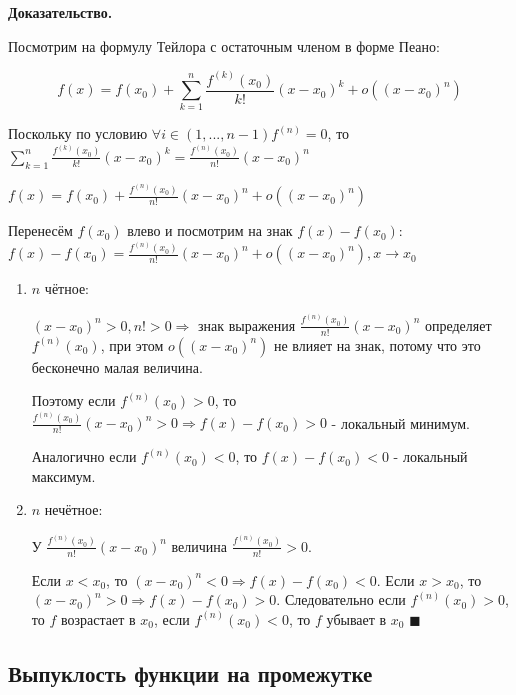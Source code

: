 \documentclass[a4paper]{article}
\begin{document}
\begin{hproof}
\textbf{Доказательство.}

Посмотрим на формулу Тейлора с остаточным членом в форме Пеано:

\begin{equation}
\displaystyle f(x) = f(x_0) + \sum_{k=1}^n \frac{f^{(k)} (x_0)}{k!} (x-x_0)^k + o((x-x_0)^n)
\end{equation}

Поскольку по условию $\displaystyle \forall i \in (1, ..., n-1) f ^{(n)} = 0$, то $\sum_{k=1}^n \frac{f^{(k)} (x_0)}{k!} (x-x_0)^k = \frac{f^{(n)} (x_0)}{n!} (x-x_0)^n$

$f(x) = f(x_0) + \frac{f^{(n)} (x_0)}{n!} (x-x_0)^n + o((x-x_0)^n)$

Перенесём $f(x_0)$ влево и посмотрим на знак $f(x) - f(x_0)$: $f(x) - f(x_0) = \frac{f^{(n)} (x_0)}{n!} (x-x_0)^n + o((x-x_0)^n), x \rightarrow x_0$

\begin{enumerate}
\item $n$ чётное:

$(x-x_0)^n > 0, n!>0 \Rightarrow$ знак выражения $\displaystyle \frac{f^{(n)} (x_0)}{n!} (x-x_0)^n$ определяет $f^{(n)} (x_0)$, при этом $o((x-x_0)^n)$ не влияет на знак, потому что это бесконечно малая величина.

Поэтому если $f^{(n)} (x_0) > 0$, то $\displaystyle \frac{f^{(n)} (x_0)}{n!} (x-x_0)^n > 0 \Rightarrow f(x) - f(x_0) > 0$ - локальный минимум.

Аналогично если $f^{(n)} (x_0) < 0$, то $f(x) - f(x_0) < 0$ - локальный максимум.

\item $n$ нечётное:

У $\displaystyle \frac{f^{(n)} (x_0)}{n!} (x-x_0)^n$ величина $\displaystyle \frac{f^{(n)} (x_0)}{n!} > 0$. 

Если $x < x_0$, то $(x-x_0)^n < 0 \Rightarrow f(x) - f(x_0) < 0$.
Если $x > x_0$, то $(x-x_0)^n > 0 \Rightarrow f(x) - f(x_0) > 0$.
Следовательно если $f^{(n)} (x_0) > 0$, то $f$ возрастает в $x_0$, если $f^{(n)} (x_0) < 0$, то $f$ убывает в $x_0$ $\blacksquare$
\end{enumerate}

\end{hproof}

\subsection*{Выпуклость функции на промежутке}
\end{document}
